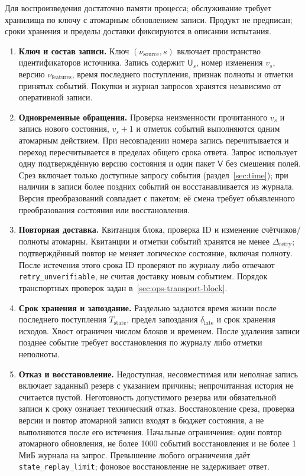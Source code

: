 \documentclass[12pt,a4paper]{article}
\newcommand{\code}[1]{{\ttfamily\small\nolinkurl{#1}}}
\theoremstyle{plainru}
\begin{document}
Для воспроизведения достаточно памяти процесса; обслуживание требует
хранилища по ключу с атомарным обновлением записи. Продукт не предписан;
сроки хранения и пределы доставки фиксируются в описании испытания.
\begin{enumerate}
\item \textbf{Ключ и состав записи.}
Ключ $(\nu_{\mathrm{source}},s)$ включает пространство идентификаторов
источника. Запись содержит $\mathsf U_s$, номер изменения $v_s$,
версию $\nu_{\mathrm{features}}$, время последнего поступления,
признак полноты и отметки принятых событий.
Покупки и журнал запросов хранятся независимо от оперативной записи.

\item \textbf{Одновременные обращения.}
Проверка неизменности прочитанного $v_s$ и запись нового состояния,
$v_s+1$ и отметок событий выполняются одним атомарным действием.
При несовпадении номера запись перечитывается и переход пересчитывается
в пределах общего срока ответа.
Запрос использует одну подтверждённую версию состояния и один пакет
$\mathsf V$ без смешения полей. Срез включает только доступные запросу
события (раздел~\ref{sec:time}); при наличии в записи более поздних
событий он восстанавливается из журнала.
Версия преобразований совпадает с пакетом; её смена требует
объявленного преобразования состояния или восстановления.

\item \textbf{Повторная доставка.}
Квитанция блока, проверка ID и изменение счётчиков/полноты атомарны.
Квитанции и отметки событий хранятся не менее $\Delta_{\mathrm{retry}}$;
подтверждённый повтор не меняет логическое состояние, включая полноту.
После истечения этого срока ID проверяют по журналу либо отвечают
\code{retry_unverifiable}, не считая доставку новым событием.
Порядок транспортных проверок задан в~\ref{sec:ops-transport-block}.

\item \textbf{Срок хранения и запоздание.}
Раздельно задаются время жизни после последнего поступления
$T_{\mathrm{state}}$, предел запоздания $\delta_{\mathrm{late}}$
и срок хранения исходов. Хвост ограничен числом блоков и временем.
После удаления записи позднее событие требует восстановления
по журналу либо отметки неполноты.

\item \textbf{Отказ и восстановление.}
Недоступная, несовместимая или неполная запись включает заданный резерв
с указанием причины; непрочитанная история не считается пустой.
Неготовность допустимого резерва или обязательной записи к сроку
означает технический отказ.
Восстановление среза, проверка версии и повтор атомарной записи
входят в бюджет состояния, а не выполняются после его истечения.
Начальные ограничения: один повтор атомарного обновления,
не более 1000 событий восстановления и не более 1 МиБ журнала
на запрос. Превышение любого ограничения даёт
\code{state_replay_limit}; фоновое восстановление не задерживает ответ.


\end{enumerate}
\end{document}
